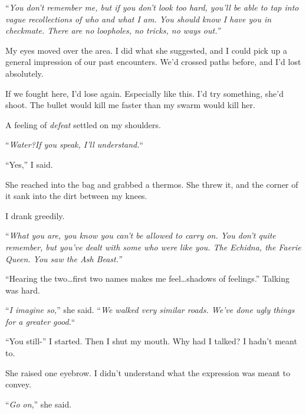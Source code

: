 ``\emph{You don't remember me, but if you don't look too hard, you'll be able to tap into vague recollections of who and what I am.  You should know I have you in checkmate.  There are no loopholes, no tricks, no ways out.''}



My eyes moved over the area.  I did what she suggested, and I could pick up a general impression of our past encounters.  We'd crossed paths before, and I'd lost absolutely.



If we fought here, I'd lose again.  Especially like this.  I'd try something, she'd shoot.  The bullet would kill me faster than my swarm would kill her.



A feeling of \emph{defeat} settled on my shoulders.



``\emph{Water?}\emph{If you speak, I'll understand.}``



``Yes,'' I said.



She reached into the bag and grabbed a thermos.  She threw it, and the corner of it sank into the dirt between my knees.



I drank greedily.



``\emph{What you are, you know you can't be allowed to carry on.  You don't quite remember, but you've dealt with some who were like you.  The Echidna, the Faerie Queen.  You saw the Ash Beast.''}



``Hearing the two\ldots first two names makes me feel\ldots shadows of feelings.''  Talking was hard.



``\emph{I imagine so,}'' she said.  ``\emph{We walked very similar roads.  We've done ugly things for a greater good.}``



``You still-'' I started.  Then I shut my mouth.  Why had I talked?  I hadn't meant to.



She raised one eyebrow.  I didn't understand what the expression was meant to convey.



``\emph{Go on},'' she said.



